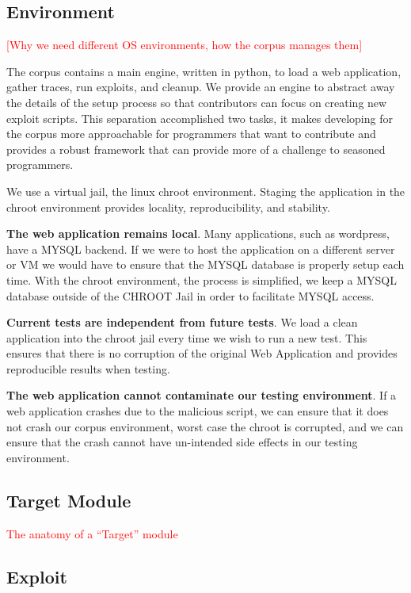 \documentclass[letterpaper,twocolumn,10pt]{article}
\begin{document}
\subsection{Environment}
\textcolor{red}{[Why we need different OS environments, how the corpus manages them]}

The corpus contains a main engine, written in python, to load a web application, gather traces, run exploits, and cleanup.  We provide an engine to abstract away the details of the setup process so that contributors can focus on creating new exploit scripts.  This separation accomplished two tasks, it makes developing for the corpus more approachable for programmers that want to contribute and provides a robust framework that can provide more of a challenge to seasoned programmers.

We use a virtual jail, the linux chroot environment.  Staging the application in the chroot environment provides locality, reproducibility, and stability.  

{\bf The web application remains local}.  Many applications, such as wordpress, have a MYSQL backend.  If we were to host the application on a different server or VM we would have to ensure that the MYSQL database is properly setup each time.  With the chroot environment, the process is simplified, we keep a MYSQL database outside of the CHROOT Jail in order to facilitate MYSQL access.  

{\bf Current tests are independent from future tests}.  We load a clean application into the chroot jail every time we wish to run a new test.  This ensures that there is no corruption of the original Web Application and provides reproducible results when testing.

{\bf The web application cannot contaminate our testing environment}.  If a web application crashes due to the malicious script, we can ensure that it does not crash our corpus environment, worst case the chroot is corrupted, and we can ensure that the crash cannot have un-intended side effects in our testing environment.  


\subsection{Target Module}
\textcolor{red}{The anatomy of a ``Target'' module}
\subsection{Exploit}
\end{document}
